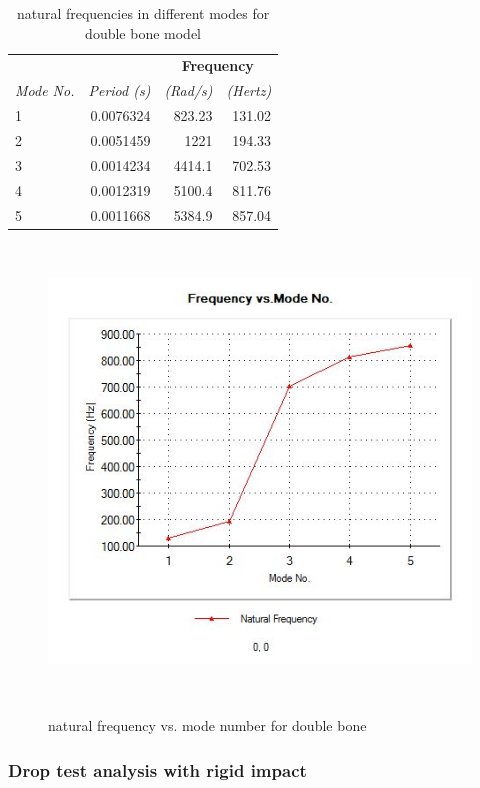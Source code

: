 \documentclass{sigchi}
\begin{document}
\begin{table}
  \centering
  \begin{tabular}{l r r r}
    & & \multicolumn{2}{c}{\small{\textbf{Frequency}}} \\
    \cmidrule(r){3-4}
    {\small\textit{Mode No.}}
    & {\small \textit{Period (s)}}
      & {\small \textit{(Rad/s)}}
    & {\small \textit{(Hertz)}} \\
    \midrule
    1 & 0.0076324 & 823.23 & 131.02 \\
    2 & 0.0051459 & 1221 & 194.33 \\
    3 & 0.0014234 & 4414.1 & 702.53 \\
    4 & 0.0012319 & 5100.4 & 811.76 \\
    5 & 0.0011668 & 5384.9 & 857.04 \\
  \end{tabular}
  \caption{natural frequencies in different modes for double bone model}~\label{tab:db_freq}
\end{table}

\begin{figure}
\centering
  \includegraphics[width=0.9\columnwidth]{figures/db_freq1_graph1}
  \caption{natural frequency vs. mode number for double bone}~\label{fig:db_freq1_graph1}
\end{figure}


\subsubsection{Drop test analysis with rigid impact}
\end{document}
